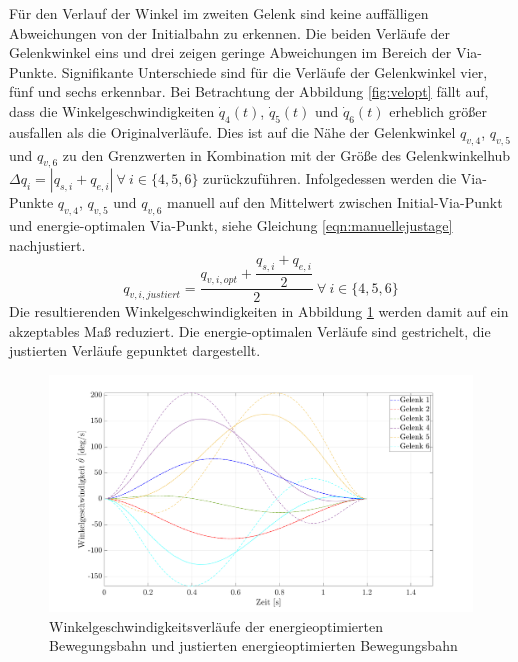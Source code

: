 %
Für den Verlauf der Winkel im zweiten Gelenk sind keine auffälligen Abweichungen von der Initialbahn zu erkennen. Die beiden Verläufe der Gelenkwinkel eins und drei zeigen geringe Abweichungen im Bereich der Via-Punkte. Signifikante Unterschiede sind für die Verläufe der Gelenkwinkel vier, fünf und sechs erkennbar.  Bei Betrachtung der Abbildung \ref{fig:velopt} fällt auf, dass die Winkelgeschwindigkeiten $\dot{q}_{4}(t)$, $\dot{q}_{5}(t)$ und $\dot{q}_{6}(t)$ erheblich größer ausfallen als die Originalverläufe. Dies ist auf die Nähe der Gelenkwinkel ${q}_{v,4}$, ${q}_{v,5}$ und ${q}_{v,6}$ zu den Grenzwerten in Kombination mit der Größe des Gelenkwinkelhub $\Delta q_i = | q_{s,i}+q_{e,i} | ~\forall~ i \in \{4,5,6\}$ zurückzuführen. Infolgedessen werden die Via-Punkte ${q}_{v,4}$, ${q}_{v,5}$ und ${q}_{v,6}$ manuell auf den Mittelwert zwischen Initial-Via-Punkt und energie-optimalen Via-Punkt, siehe Gleichung \ref{eqn:manuellejustage} nachjustiert.
%
\begin{equation}
	\label{eqn:manuellejustage}
	{q}_{v,i,justiert} = \dfrac{{q}_{v,i,opt} + \dfrac{q_{s,i}+q_{e,i}}{2}}{2}~\forall~ i \in \{4,5,6\}
\end{equation}
%
Die resultierenden Winkelgeschwindigkeiten in Abbildung \ref{fig:veloptedit} 
werden damit auf ein akzeptables Maß reduziert. Die energie-optimalen Verläufe sind gestrichelt, die justierten Verläufe gepunktet dargestellt.
%
\begin{figure}[tbph]
	\centering
	\includegraphics[width=1\linewidth]{images/Optimierungsergebnisse_up/veloptedit}
	\caption{Winkelgeschwindigkeitsverläufe der energieoptimierten Bewegungsbahn und justierten energieoptimierten Bewegungsbahn}
	\label{fig:veloptedit}
\end{figure}
%
